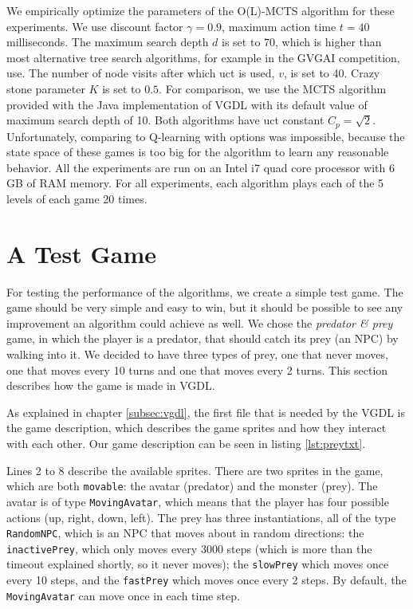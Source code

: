 We empirically optimize the parameters of the O(L)-MCTS algorithm
for these experiments. We use discount factor $\gamma = 0.9$, maximum action
time $t = 40$ milliseconds. The maximum search depth $d$ is set to 70, which is
higher than most alternative tree search algorithms, for example in the GVGAI
competition, use. The number of node visits after which \textsf{uct} is used,
$v$, is set to 40. Crazy stone parameter $K$ is set to $0.5$.  For comparison,
we use the MCTS algorithm provided with the Java implementation of VGDL with its
default value of maximum search depth of 10. Both algorithms have \textsf{uct}
constant $C_p = \sqrt{2}$. Unfortunately, comparing to Q-learning with options
was impossible, because the state space of these games is too big for the
algorithm to learn any reasonable behavior. All the experiments are run on an
Intel i7  quad core processor with 6 GB of RAM memory. For all
experiments, each algorithm plays each of the 5 levels of each game
20 times. 

\section{A Test Game}





For testing the performance of the algorithms, we create a simple test game. The
game should be very simple and easy to win, but it should be possible to see any
improvement an algorithm could achieve as well. We chose the \emph{predator \&
prey} game, in which the player is a predator, that should catch its prey (an
NPC) by walking into it. We decided to have three types of prey, one that never
moves, one that moves every 10 turns and one that moves every 2 turns. This
section describes how the game is made in VGDL.

As explained in chapter \ref{subsec:vgdl}, the first file that is needed by the
VGDL is the game description, which describes the game sprites and how they
interact with each other. Our game description can be seen in listing
\ref{lst:preytxt}.


Lines 2 to 8 describe the available sprites. There are two sprites in the game,
which are both \texttt{movable}: the avatar (predator) and the monster (prey).
The avatar is of type \texttt{MovingAvatar}, which means that the player has
four possible actions (up, right, down, left). The prey has three
instantiations, all of the type \texttt{RandomNPC}, which is an NPC that moves
about in random directions: the \texttt{inactivePrey}, which only moves every
3000 steps (which is more than the timeout explained shortly, so it never
moves); the \texttt{slowPrey} which moves once every 10 steps, and the
\texttt{fastPrey} which moves once every 2 steps.  By default, the
\texttt{MovingAvatar} can move once in each time step.

